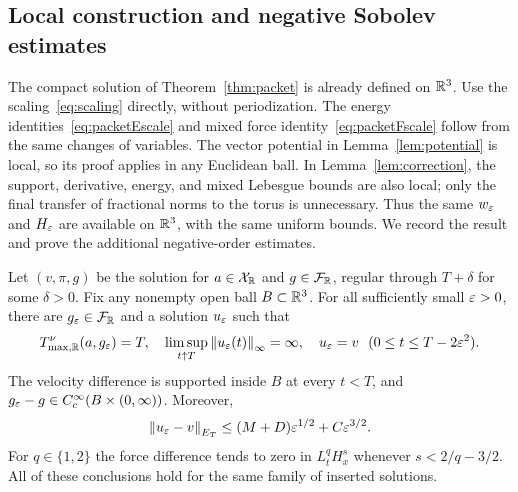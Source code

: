\subsection{Local construction and negative Sobolev estimates}
The compact solution of Theorem~\ref{thm:packet} is already defined on
$\mathbb R^3$. Use the scaling~\eqref{eq:scaling} directly, without
periodization. The energy identities~\eqref{eq:packetEscale} and mixed
force identity~\eqref{eq:packetFscale} follow from the same changes of
variables. The vector potential in Lemma~\ref{lem:potential} is local,
so its proof applies in any Euclidean ball. In
Lemma~\ref{lem:correction}, the support, derivative, energy, and mixed
Lebesgue bounds are also local; only the final transfer of fractional
norms to the torus is unnecessary. Thus the same $w_\varepsilon$ and $H_\varepsilon$
are available on $\mathbb R^3$, with the same uniform bounds. We record the
result and prove the additional negative-order estimates.
\begin{theorem}\label{thm:Rinsert}
Let $(v,\pi,g)$ be the solution for $a\in\mathcal X_{\mathbb R}$ and $g\in\mathcal F_{\mathbb R}$, regular through $T+\delta$ for some $\delta>0$. Fix any nonempty open ball $B\subset\mathbb R^3$. For all sufficiently small $\varepsilon>0$, there are $g_\varepsilon\in\mathcal F_{\mathbb R}$ and a solution $u_\varepsilon$ such that
\[
 T^\nu_{\max,\mathbb R}(a,g_\varepsilon)=T,\quad
 \limsup_{t\uparrow T}\left\lVert u_\varepsilon(t)\right\rVert_\infty=\infty,\quad
 u_\varepsilon=v\ \ (0\le t\le T-2\varepsilon^2).
\]
The velocity difference is supported inside $B$ at every $t<T$, and $g_\varepsilon-g\in C_c^\infty(B\times(0,\infty))$. Moreover,
\begin{equation}\label{eq:REclose}
 \left\lVert u_\varepsilon-v\right\rVert_{E_T}\le(M+D)\varepsilon^{1/2}+C\varepsilon^{3/2}.
\end{equation}
For $q\in\{1,2\}$ the force difference tends to zero in $L^q_tH^s_x$ whenever $s<2/q-3/2$. All of these conclusions hold for the same family of inserted solutions.
\end{theorem}
